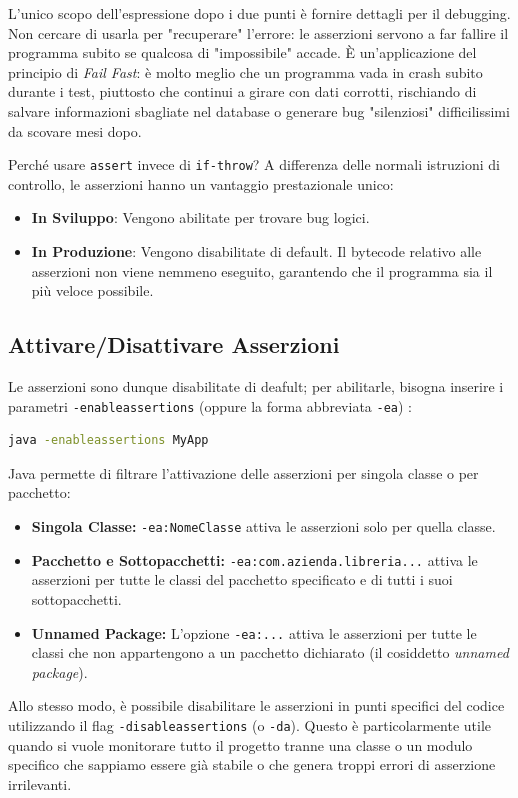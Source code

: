 \begin{tip}[]
L'unico scopo dell'espressione dopo i due punti è fornire dettagli per il debugging. Non cercare di usarla per "recuperare" l'errore: le asserzioni servono a far fallire il programma subito se qualcosa di "impossibile" accade. È un'applicazione del principio di \textit{Fail Fast}: è molto meglio che un programma vada in crash subito durante i test, piuttosto che continui a girare con dati corrotti, rischiando di salvare informazioni sbagliate nel database o generare bug "silenziosi" difficilissimi da scovare mesi dopo.
\end{tip}

Perché usare \texttt{assert} invece di \texttt{if-throw}? A differenza delle normali istruzioni di controllo, le asserzioni hanno un vantaggio prestazionale unico:

\begin{itemize}
    \item \textbf{In Sviluppo}: Vengono abilitate per trovare bug logici.
    \item \textbf{In Produzione}: Vengono disabilitate di default. Il bytecode relativo alle asserzioni non viene nemmeno eseguito, garantendo che il programma sia il più veloce possibile.
\end{itemize}
\medskip

\subsection{Attivare/Disattivare Asserzioni}
Le asserzioni sono dunque disabilitate di deafult; per abilitarle, bisogna inserire i parametri \texttt{-enableassertions} (oppure la forma abbreviata \texttt{-ea}) :

\begin{lstlisting}[language=bash, caption={}]
java -enableassertions MyApp
\end{lstlisting}

Java permette di filtrare l'attivazione delle asserzioni per singola classe o per pacchetto:

\begin{itemize}
    \item \textbf{Singola Classe:} \texttt{-ea:NomeClasse} attiva le asserzioni solo per quella classe.
    \item \textbf{Pacchetto e Sottopacchetti:} \texttt{-ea:com.azienda.libreria...} attiva le asserzioni per tutte le classi del pacchetto specificato e di tutti i suoi sottopacchetti.
    \item \textbf{Unnamed Package:} L'opzione \texttt{-ea:...} attiva le asserzioni per tutte le classi che non appartengono a un pacchetto dichiarato (il cosiddetto \textit{unnamed package}).
\end{itemize}
\medskip
Allo stesso modo, è possibile disabilitare le asserzioni in punti specifici del codice utilizzando il flag \texttt{-disableassertions} (o \texttt{-da}). Questo è particolarmente utile quando si vuole monitorare tutto il progetto tranne una classe o un modulo specifico che sappiamo essere già stabile o che genera troppi errori di asserzione irrilevanti.

